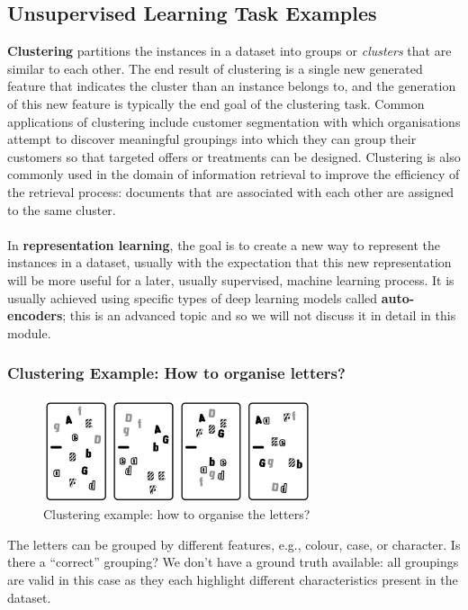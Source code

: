 \documentclass[a4paper,11pt]{article}
\begin{document}
\subsection{Unsupervised Learning Task Examples}
\textbf{Clustering} partitions the instances in a dataset into groups or \textit{clusters} that are similar to each other.
The end result of clustering is a single new generated feature that indicates the cluster than an instance belongs to, and the generation of this new feature is typically the end goal of the clustering task.
Common applications of clustering include customer segmentation with which organisations attempt to discover meaningful groupings into which they can group their customers so that targeted offers or treatments can be designed.
Clustering is also commonly used in the domain of information retrieval to improve the efficiency of the retrieval process: documents that are associated with each other are assigned to the same cluster.
\\\\
In \textbf{representation learning}, the goal is to create a new way to represent the instances in a dataset, usually with the expectation that this new representation will be more useful for a later, usually supervised, machine learning process. 
It is usually achieved using specific types of deep learning models called \textbf{auto-encoders};
this is an advanced topic and so we will not discuss it in detail in this module.

\subsubsection{Clustering Example: How to organise letters?}
\begin{figure}[H]
    \centering
    \includegraphics[width=0.7\textwidth]{images/clusteringexample.png}
    \caption{ Clustering example: how to organise the letters? }
\end{figure}

The letters can be grouped by different features, e.g., colour, case, or character.
Is there a ``correct'' grouping?
We don't have a ground truth available: all groupings are valid in this case as they each highlight different characteristics present in the dataset.
\end{document}
